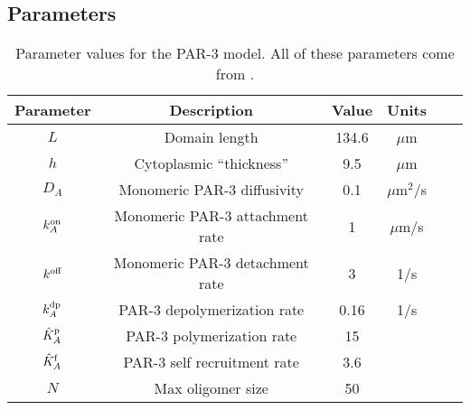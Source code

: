 \documentclass[11pt]{article}
\newcommand{\6}[1]{#1_{\text{6}}}
\newcommand{\3}[1]{#1_{\text{3}}}
\newcommand{\A}[1]{#1_A}
\begin{document}
\subsection{Parameters \label{sec:param23}}
\begin{table}
\begin{small}
\centering
\begin{tabular}{|c|c|c|c|c|c|}\hline
Parameter & Description & Value & Units \\ \hline
$L$ & Domain length & 134.6 & $\mu$m \\
$h$ & Cytoplasmic ``thickness'' & 9.5 & $\mu$m \\
$D_A $ & Monomeric PAR-3 diffusivity & 0.1 & $\mu$m$^2$/s  \\
$\A{\kon}$ & Monomeric PAR-3 attachment rate & 1& $\mu$m/s  \\
$k^\text{off}$ & Monomeric PAR-3 detachment rate &  3& 1/s \\
$\A{\kdp}$ & PAR-3 depolymerization rate & 0.16 & 1/s  \\
$\hat{K}^\text{p}_A$ & PAR-3 polymerization rate & 15 &   \\
$\hat{K}^\text{f}_A$ & PAR-3 self recruitment rate &3.6 & \\
$N$ & Max oligomer size & 50 & \\ \hline
\end{tabular}
\caption{\label{tab:paramsP3}Parameter values for the PAR-3 model. All of these parameters come from \cite{lang2023oligomerization}.}
\end{small}
\end{table}
\end{document}
